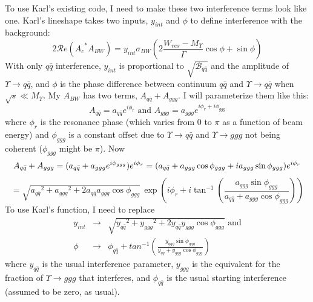 \documentclass[12pt]{article}
\begin{document}
To use Karl's existing code, I need to make these two interference
terms look like one.  Karl's lineshape takes two inputs, $y_{int}$ and
$\phi$ to define interference with the background:
\begin{equation}
2{\mathcal Re}({A_c}^* A_{BW}) = y_{int} \sigma_{BW}
\left(2\frac{W_{res} - M_\Upsilon}{\Gamma} \cos\phi + \sin\phi \right)
\end{equation}
With only $q\bar{q}$ interference, $y_{int}$ is proportional to
$\sqrt{{\mathcal B}_{q\bar{q}}}$ and the amplitude of $\Upsilon \to
q\bar{q}$, and $\phi$ is the phase difference between continuum
$q\bar{q}$ and $\Upsilon \to q\bar{q}$ when $\sqrt{s} \ll M_\Upsilon$.
My $A_{BW}$ has two terms, $A_{q\bar{q}} + A_{ggg}$.  I will
parameterize them like this:
\begin{equation}
A_{q\bar{q}} = a_{q\bar{q}} e^{i\phi_r}  \mbox{ and }  A_{ggg} = a_{ggg} e^{i\phi_r + i\phi_{ggg}}
\end{equation}
where $\phi_r$ is the resonance phase (which varies from $0$ to $\pi$
as a function of beam energy) and $\phi_{ggg}$ is a constant offset due to
$\Upsilon \to q\bar{q}$ and $\Upsilon \to ggg$ not being coherent
($\phi_{ggg}$ might be $\pi$).  Now
\begin{equation}
A_{q\bar{q}} + A_{ggg} = (a_{q\bar{q}} + a_{ggg} e^{i\phi_{ggg}}) e^{i\phi_r} = (a_{q\bar{q}} + a_{ggg}
\cos\phi_{ggg} + i a_{ggg} \sin\phi_{ggg}) e^{i\phi_r} \\
\end{equation}
\begin{equation}
= \sqrt{{a_{q\bar{q}}}^2 + {a_{ggg}}^2 + 2 a_{q\bar{q}} a_{ggg} \cos\phi_{ggg}} \, \exp\left(i\phi_r +
i\tan^{-1}\left(\frac{a_{ggg} \sin\phi_{ggg}}{a_{q\bar{q}} + a_{ggg}\cos\phi_{ggg}} \right)\right)
\end{equation}
To use Karl's function, I need to replace
\begin{eqnarray}
y_{int} &\to& \sqrt{{y_{q\bar{q}}}^2 + {y_{ggg}}^2 + 2 y_{q\bar{q}}
y_{ggg} \cos\phi_{ggg}} \mbox{ and} \\
\phi &\to& \phi_{q\bar{q}} + tan^{-1} \left(\frac{y_{ggg} \sin\phi_{ggg}}{y_{q\bar{q}} + y_{ggg}\cos\phi_{ggg}} \right)
\end{eqnarray}
where $y_{q\bar{q}}$ is the usual interference parameter, $y_{ggg}$ is
the equivalent for the fraction of $\Upsilon \to ggg$ that interferes,
and $\phi_{q\bar{q}}$ is the usual starting interference (assumed to
be zero, as usual).

\pagebreak
\end{document}
